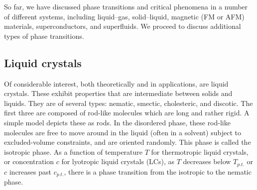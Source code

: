 So far, we have discussed phase transitions and critical phenomena in a number of different systems, including
liquid--gas, solid--liquid, magnetic (FM or AFM) materials, superconductors, and superfluids. We proceed to discuss
additional types of phase transitions.

\subsection{Liquid crystals}

Of considerable interest, both theoretically and in applications, are liquid crystals. These exhibit properties
that are intermediate between solids and liquids. They are of several types: nematic, smectic, cholesteric, and
discotic. The first three are composed of rod-like molecules which are long and rather rigid. A simple model
depicts these as rods. In the disordered phase, these rod-like molecules are free to move around in the liquid (often
in a solvent) subject to excluded-volume constraints, and are oriented randomly. This phase is called the isotropic
phase. As a function of temperature $T$ for thermotropic liquid crystals, or concentration $c$ for lyotropic liquid
crystals (LCs), as $T$ decreases below $T_{p.t.}$ or $c$ increases past $c_{p.t.}$, there is a phase transition from the
isotropic to the nematic phase.

\begin{diagram}
\end{diagram}

